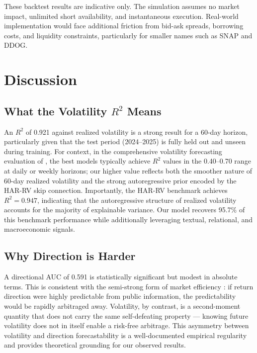 \documentclass[12pt, a4paper]{article}
\begin{document}
These backtest results are indicative only. The simulation assumes no market impact, unlimited short availability, and instantaneous execution. Real-world implementation would face additional friction from bid-ask spreads, borrowing costs, and liquidity constraints, particularly for smaller names such as SNAP and DDOG.


\section{Discussion}
\label{sec:discussion}

\subsection{What the Volatility $R^2$ Means}

An $R^2$ of 0.921 against realized volatility is a strong result for a 60-day horizon, particularly given that the test period (2024--2025) is fully held out and unseen during training. For context, in the comprehensive volatility forecasting evaluation of \citet{patton2011volatility}, the best models typically achieve $R^2$ values in the 0.40--0.70 range at daily or weekly horizons; our higher value reflects both the smoother nature of 60-day realized volatility and the strong autoregressive prior encoded by the HAR-RV skip connection. Importantly, the HAR-RV benchmark achieves $R^2 = 0.947$, indicating that the autoregressive structure of realized volatility accounts for the majority of explainable variance. Our model recovers 95.7\% of this benchmark performance while additionally leveraging textual, relational, and macroeconomic signals.

\subsection{Why Direction is Harder}

A directional AUC of 0.591 is statistically significant but modest in absolute terms. This is consistent with the semi-strong form of market efficiency \citep{fama1970efficient}: if return direction were highly predictable from public information, the predictability would be rapidly arbitraged away. Volatility, by contrast, is a second-moment quantity that does not carry the same self-defeating property --- knowing future volatility does not in itself enable a risk-free arbitrage. This asymmetry between volatility and direction forecastability is a well-documented empirical regularity and provides theoretical grounding for our observed results.
\end{document}
